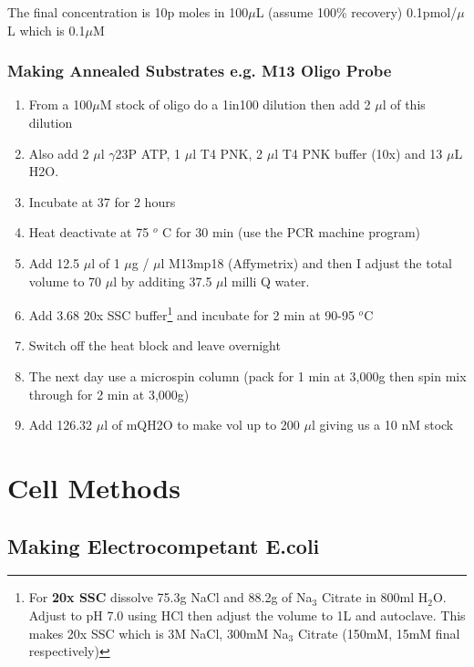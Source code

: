 \documentclass{tufte-book} %
\begin{document}
The final concentration is 10p moles in 100$\mu$L (assume 100\% recovery) 0.1pmol/$\mu$L which is 0.1$\mu$M


\subsection{Making Annealed Substrates e.g. M13 Oligo Probe}

\begin{enumerate}
\item From a 100$\mu$M stock of oligo do a 1in100 dilution then add 2 $\mu$l of this dilution
\item Also add 2 $\mu$l $\gamma$23P ATP, 1 $\mu$l T4 PNK, 2 $\mu$l T4 PNK buffer (10x) and 13 $\mu$L H2O.
\item Incubate at 37 for 2 hours
\item Heat deactivate at 75 $^{o}$ C for 30 min (use the PCR machine program)
\item Add 12.5 $\mu$l of 1 $\mu$g / $\mu$l M13mp18 (Affymetrix) and then I adjust the total volume to 70 $\mu$l by additing 37.5 $\mu$l milli Q water.
\item Add 3.68 20x SSC buffer\footnote{For \textbf{20x SSC} dissolve 75.3g NaCl and 88.2g of Na$_{3}$ Citrate in 800ml H$_{2}$O. Adjust to pH 7.0 using HCl then adjust the volume to 1L and autoclave. This makes 20x SSC which is 3M NaCl, 300mM Na$_{3}$ Citrate (150mM, 15mM final respectively)} and incubate for 2 min at 90-95 $^{o}$C
\item Switch off the heat block and leave overnight
\item The next day use a microspin column (pack for 1 min at 3,000g then spin mix through for 2 min at 3,000g)
\item Add 126.32 $\mu$l of mQH2O to make vol up to 200 $\mu$l giving us a 10 nM stock
\end{enumerate}



\chapter{Cell Methods}

\section{Making Electrocompetant E.coli}
\end{document}
